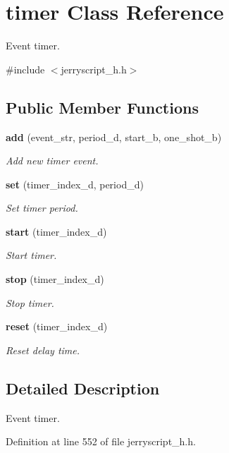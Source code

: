 \section{timer Class Reference}
\label{classtimer}


Event timer.  




{\ttfamily \#include $<$jerryscript\+\_\+h.\+h$>$}

\subsection*{Public Member Functions}
\begin{DoxyCompactItemize}
\item 
\textbf{ add} (event\+\_\+str, period\+\_\+d, start\+\_\+b, one\+\_\+shot\+\_\+b)
\begin{DoxyCompactList}\small\item\em Add new timer event. \end{DoxyCompactList}\item 
\textbf{ set} (timer\+\_\+index\+\_\+d, period\+\_\+d)
\begin{DoxyCompactList}\small\item\em Set timer period. \end{DoxyCompactList}\item 
\textbf{ start} (timer\+\_\+index\+\_\+d)
\begin{DoxyCompactList}\small\item\em Start timer. \end{DoxyCompactList}\item 
\textbf{ stop} (timer\+\_\+index\+\_\+d)
\begin{DoxyCompactList}\small\item\em Stop timer. \end{DoxyCompactList}\item 
\textbf{ reset} (timer\+\_\+index\+\_\+d)
\begin{DoxyCompactList}\small\item\em Reset delay time. \end{DoxyCompactList}\end{DoxyCompactItemize}


\subsection{Detailed Description}
Event timer. 

Definition at line 552 of file jerryscript\+\_\+h.\+h.



